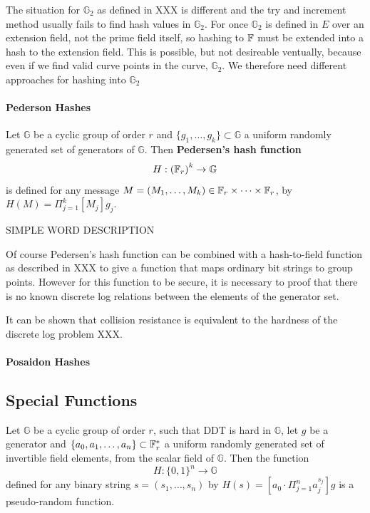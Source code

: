 The situation for $\mathbb{G}_2$ as defined in XXX is different and the try and increment method usually fails to find hash values in $\mathbb{G}_2$. For once $\mathbb{G}_2$ is defined in $E$ over an extension field, not the prime field itself, so hashing to $\mathbb{F}$ must be extended into a hash to the extension field. This is possible, but not desireable ventually, because even if we find valid curve points in the curve, $\mathbb{G}_2$. We therefore need different approaches for hashing into $\mathbb{G}_2$

\paragraph{Pederson Hashes}
\begin{definition}
Let $\mathbb{G}$ be a cyclic group of order $r$ and $\{g_1, \ldots, g_k\} \subset \mathbb{G}$ a uniform randomly generated set of generators of $\mathbb{G}$. Then \textbf{Pedersen’s hash function} 
$$
H : \left(\mathbb{F}_r\right)^k \to \mathbb{G}
$$
is defined for any message $M = (M_1,\ldots,M_k)\in \mathbb{F}_r \times \cdots \times \mathbb{F}_r$, 
by $H(M) =\Pi_{j=1}^k [M_j]g_j$.
\end{definition}
SIMPLE WORD DESCRIPTION
\begin{remark} Of course Pedersen's hash function can be combined with a hash-to-field function as described in XXX to give a function that maps ordinary bit strings to group points. However
for this function to be secure, it is necessary to proof that there is no known discrete log relations between the elements of the generator set.

It can be shown that collision resistance is equivalent to the hardness of the discrete log problem XXX.
\end{remark}
\begin{example}

\end{example}
\paragraph{Posaidon Hashes}
\subsection{Special Functions}
\begin{theorem}
Let $\mathbb{G}$ be a cyclic group of order $r$, such that DDT is hard in $\mathbb{G}$, let $g$ be a generator and $\{a_0,a_1,\ldots,a_n\}\subset \mathbb{F}_{r}^*$ a uniform randomly generated set of invertible field elements, from the scalar field of $\mathbb{G}$. Then the function
$$
H: \{0,1\}^n \to \mathbb{G}
$$
defined for any binary string $s=(s_1,\ldots,s_n)$ by $H(s)= [a_0\cdot \Pi_{j=1}^n a_j^{s_j}]g$
is a pseudo-random function.
\end{theorem}

